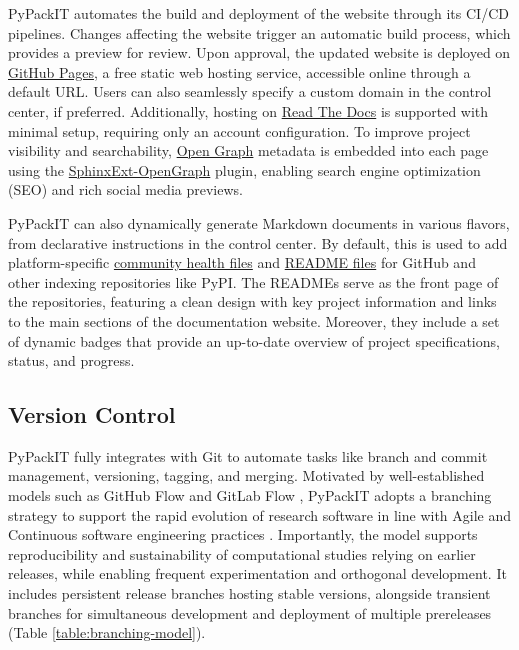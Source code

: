 \documentclass{article}
\begin{document}
PyPackIT automates the build and deployment of the website through its CI/CD pipelines. Changes affecting the website trigger an automatic build process, which provides a preview for review. Upon approval, the updated website is deployed on \href{https://pages.github.com/}{GitHub Pages}, a free static web hosting service, accessible online through a default URL. Users can also seamlessly specify a custom domain in the control center, if preferred. Additionally, hosting on \href{https://readthedocs.org/}{Read The Docs} is supported with minimal setup, requiring only an account configuration. To improve project visibility and searchability, \href{https://ogp.me/}{Open Graph} metadata is embedded into each page using the \href{https://github.com/wpilibsuite/sphinxext-opengraph}{SphinxExt-OpenGraph} plugin, enabling search engine optimization (SEO) and rich social media previews.

PyPackIT can also dynamically generate Markdown documents in various flavors, from declarative instructions in the control center. By default, this is used to add platform-specific \href{https://docs.github.com/en/communities/setting-up-your-project-for-healthy-contributions/creating-a-default-community-health-file#supported-file-types}{community health files} and \href{https://docs.github.com/en/repositories/managing-your-repositorys-settings-and-features/customizing-your-repository/about-readmes}{README files} for GitHub and other indexing repositories like PyPI. The READMEs serve as the front page of the repositories, featuring a clean design with key project information and links to the main sections of the documentation website. Moreover, they include a set of dynamic badges \cite{RepositoryBadges} that provide an up-to-date overview of project specifications, status, and progress.

\subsection{Version Control}

PyPackIT fully integrates with Git to automate tasks like branch and commit management, versioning, tagging, and merging. Motivated by well-established models such as GitHub Flow and GitLab Flow \cite{GitHubFlow, GitLabFlow}, PyPackIT adopts a branching strategy to support the rapid evolution of research software in line with Agile and Continuous software engineering practices \cite{CICDSystematicReview}. Importantly, the model supports reproducibility and sustainability of computational studies relying on earlier releases, while enabling frequent experimentation and orthogonal development. It includes persistent release branches hosting stable versions, alongside transient branches for simultaneous development and deployment of multiple prereleases (Table \ref{table:branching-model}).
\end{document}
